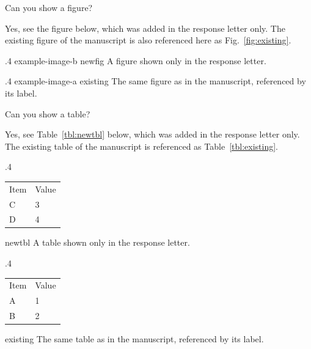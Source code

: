 \documentclass[journal]{IEEEtran}
\begin{document}
\begin{responseletter}
\begin{revcomment}
\begin{revresponse}
    \revdots{}
    \bigbreak{}
  \end{revresponse}
\end{revcomment}

\begin{revcomment}
  Can you show a figure? \lipsum[1]

  \begin{revresponse}
    Yes, see the figure below, which was added in the response letter only.
    The existing figure of the manuscript is also referenced here as Fig.~\ref{fig:existing}.
  \end{revresponse}

  \inplacefigure
    {.4\linewidth}
    {example-image-b}
    {newfig}
    {A figure shown only in the response letter.}

  \inplacefigure
    {.4\linewidth}
    {example-image-a}
    {existing}
    {The same figure as in the manuscript, referenced by its label.}
\end{revcomment}

\begin{revcomment}
  Can you show a table? \lipsum[1]

  \begin{revresponse}
    Yes, see Table~\ref{tbl:newtbl} below, which was added in the response letter only.
    The existing table of the manuscript is referenced as Table~\ref{tbl:existing}.
  \end{revresponse}

  \inplacetable
    {.4\linewidth}
    {\centering\begin{tabular}{ll} Item & Value \\ C & 3 \\ D & 4 \end{tabular}}
    {newtbl}
    {A table shown only in the response letter.}

  \inplacetable
    {.4\linewidth}
    {\centering\begin{tabular}{ll} Item & Value \\ A & 1 \\ B & 2 \end{tabular}}
    {existing}
    {The same table as in the manuscript, referenced by its label.}
\end{revcomment}

\end{responseletter}
\end{document}
